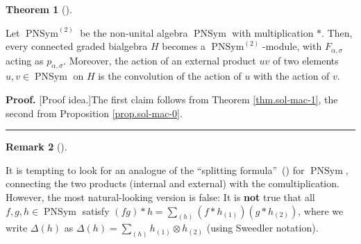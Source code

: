 \documentclass[numbers=enddot,12pt,final,onecolumn,notitlepage]{scrartcl}%
\theoremstyle{definition}
\newtheorem{theo}{Theorem}[section]
\newenvironment{theorem}[1][]
{\begin{theo}[#1]\begin{leftbar}}
{\end{leftbar}\end{theo}}
\newtheorem{remk}[theo]{Remark}
\newenvironment{remark}[1][]
{\begin{remk}[#1]\begin{leftbar}}
{\end{leftbar}\end{remk}}
\newenvironment{proof}[1][Proof]{\noindent\textbf{#1.} }{\ \rule{0.5em}{0.5em}}
\let\sumnonlimits\sum
\renewcommand{\sum}{\sumnonlimits\limits}
\begin{document}
\begin{theorem}
\label{thm.PNSym.mods}Let $\operatorname*{PNSym}\nolimits^{\left(  2\right)
}$ be the non-unital algebra $\operatorname*{PNSym}$ with multiplication
$\ast$. Then, every connected graded bialgebra $H$ becomes a
$\operatorname*{PNSym}\nolimits^{\left(  2\right)  }$-module, with
$F_{\alpha,\sigma}$ acting as $p_{\alpha,\sigma}$. Moreover, the action of an
external product $uv$ of two elements $u,v\in\operatorname*{PNSym}$ on $H$ is
the convolution of the action of $u$ with the action of $v$.
\end{theorem}

\begin{proof}
[Proof idea.]The first claim follows from Theorem \ref{thm.sol-mac-1}, the
second from Proposition \ref{prop.sol-mac-0}.
\end{proof}

\begin{remark}
\label{rmk.splitting}It is tempting to look for an analogue of the
\textquotedblleft splitting formula\textquotedblright\ (\cite[Proposition
5.2]{ncsf1}) for $\operatorname*{PNSym}$, connecting the two products
(internal and external) with the comultiplication. However, the most
natural-looking version is false: It is \textbf{not} true that all
$f,g,h\in\operatorname*{PNSym}$ satisfy $\left(  fg\right)  \ast
h=\sum_{\left(  h\right)  }\left(  f\ast h_{\left(  1\right)  }\right)
\left(  g\ast h_{\left(  2\right)  }\right)  $, where we write $\Delta\left(
h\right)  $ as $\Delta\left(  h\right)  =\sum_{\left(  h\right)  }h_{\left(
1\right)  }\otimes h_{\left(  2\right)  }$ (using Sweedler notation).
\end{remark}



\end{document}
